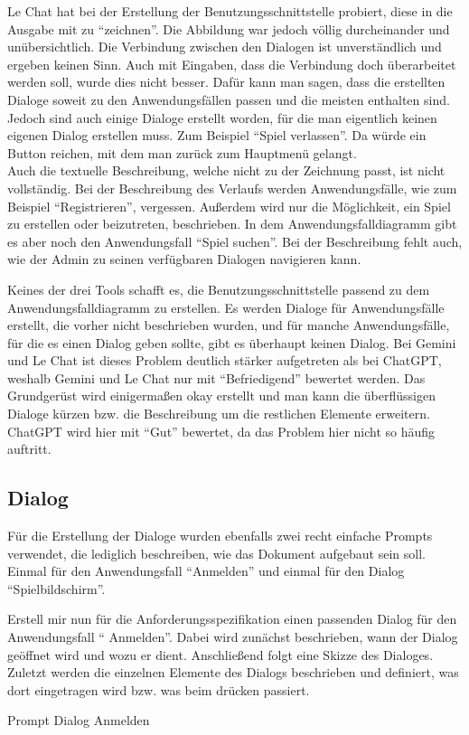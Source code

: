 Le Chat hat bei der Erstellung der Benutzungsschnittstelle probiert, diese in die Ausgabe mit zu ``zeichnen''. Die Abbildung war jedoch 
völlig durcheinander und unübersichtlich. Die Verbindung zwischen den Dialogen ist unverständlich und ergeben keinen Sinn. Auch mit 
Eingaben, dass die Verbindung doch überarbeitet werden soll, wurde dies nicht besser. Dafür kann man sagen, dass die erstellten Dialoge 
soweit zu den Anwendungsfällen passen und die meisten enthalten sind. Jedoch sind auch einige Dialoge erstellt worden, für die man 
eigentlich keinen eigenen Dialog erstellen muss. Zum Beispiel ``Spiel verlassen''. Da würde ein Button reichen, mit dem man zurück zum 
Hauptmenü gelangt.\\
Auch die textuelle Beschreibung, welche nicht zu der Zeichnung passt, ist nicht vollständig. Bei der Beschreibung des Verlaufs werden 
Anwendungsfälle, wie zum Beispiel ``Registrieren'', vergessen. Außerdem wird nur die Möglichkeit, ein Spiel zu erstellen oder beizutreten, 
beschrieben. In dem Anwendungsfalldiagramm gibt es aber noch den Anwendungsfall ``Spiel suchen''. Bei der Beschreibung fehlt auch, wie der 
Admin zu seinen verfügbaren Dialogen navigieren kann.

Keines der drei Tools schafft es, die Benutzungsschnittstelle passend zu dem Anwendungsfalldiagramm zu erstellen. Es werden Dialoge für 
Anwendungsfälle erstellt, die vorher nicht beschrieben wurden, und für manche Anwendungsfälle, für die es einen Dialog geben sollte, gibt 
es überhaupt keinen Dialog. Bei Gemini und Le Chat ist dieses Problem deutlich stärker aufgetreten als bei ChatGPT, weshalb Gemini und 
Le Chat nur mit ``Befriedigend'' bewertet werden. Das Grundgerüst wird einigermaßen okay erstellt und man kann die überflüssigen Dialoge 
kürzen bzw. die Beschreibung um die restlichen Elemente erweitern. ChatGPT wird hier mit ``Gut'' bewertet, da das Problem hier nicht so 
häufig auftritt.

\subsection*{Dialog}

Für die Erstellung der Dialoge wurden ebenfalls zwei recht einfache Prompts verwendet, die lediglich beschreiben, wie das Dokument aufgebaut 
sein soll. Einmal für den Anwendungsfall ``Anmelden'' und einmal für den Dialog ``Spielbildschirm''.

\begin{prompt}[H]
    \begin{tcolorbox}[colback=gray!20, colframe=gray!20, boxrule=0pt, sharp corners] 
        Erstell mir nun für die Anforderungsspezifikation einen passenden Dialog für den Anwendungsfall ``
    Anmelden''. Dabei wird zunächst 
        beschrieben, wann der Dialog geöffnet wird und wozu er dient. Anschließend folgt eine Skizze des Dialoges. Zuletzt werden die 
        einzelnen Elemente des Dialogs beschrieben und definiert, was dort eingetragen wird bzw. was beim drücken passiert.
        \vfill
    \end{tcolorbox}
    \caption{Prompt Dialog Anmelden}
    \label{Prompt Dialog Anmelden}
\end{prompt}

